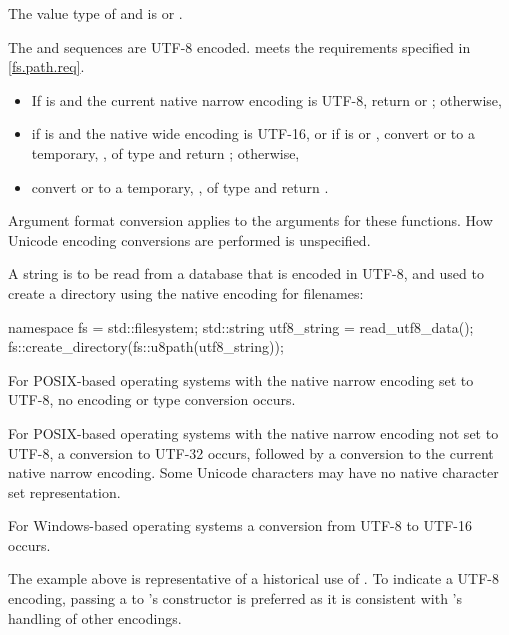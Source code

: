 \begin{itemdescr}
\pnum
\mandates
The value type of  and  is
 or .

\pnum
\expects
The  and  sequences are UTF-8 encoded.
 meets the requirements specified in \ref{fs.path.req}.

\pnum
\returns
\begin{itemize}
\item If  is  and the current native
      narrow encoding is UTF-8,
      return  or ;
      otherwise,
\item if  is  and the
      native wide encoding is UTF-16, or
      if  is  or ,
      convert  or 
      to a temporary, , of type  and
      return ;
      otherwise,
\item convert  or 
      to a temporary, , of type  and
      return .
\end{itemize}

\pnum
\remarks
Argument format conversion applies to the
  arguments for these functions. How Unicode encoding conversions are performed is
  unspecified.

\pnum
\begin{example}
A string is to be read from a database that is encoded in UTF-8, and used
    to create a directory using the native encoding for filenames:
\begin{codeblock}
namespace fs = std::filesystem;
std::string utf8_string = read_utf8_data();
fs::create_directory(fs::u8path(utf8_string));
\end{codeblock}

For POSIX-based operating systems with the native narrow encoding set
    to UTF-8, no encoding or type conversion occurs.

For POSIX-based operating systems with the native narrow encoding not
    set to UTF-8, a conversion to UTF-32 occurs, followed by a conversion to the
    current native narrow encoding. Some Unicode characters may have no native character
    set representation.

For Windows-based operating systems a conversion from UTF-8 to
    UTF-16 occurs.
\end{example}
\begin{note}
The example above is representative of
a historical use of .
To indicate a UTF-8 encoding,
passing a  to 's constructor is preferred
as it is consistent with 's handling of other encodings.
\end{note}
\end{itemdescr}

